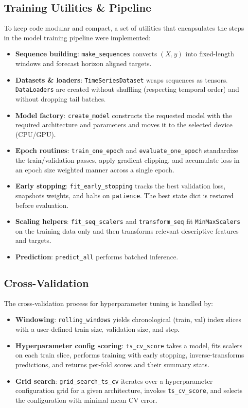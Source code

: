 \documentclass[conference]{IEEEtran}
\begin{document}
\subsection{\textbf{Training Utilities \& Pipeline}}
To keep code modular and compact, a set of utilities that encapsulates the steps in the model training pipeline were implemented:
\begin{itemize}
    \item \textbf{Sequence building}: \texttt{make\_sequences} converts $(X,y)$ into fixed-length windows and forecast horizon aligned targets.
    \item \textbf{Datasets \& loaders}: \texttt{TimeSeriesDataset} wraps sequences as tensors. \texttt{DataLoaders} are created without shuffling (respecting temporal order) and without dropping tail batches.
    \item \textbf{Model factory}: \texttt{create\_model} constructs the requested model with the required architecture and parameters and moves it to the selected device (CPU/GPU).
    \item \textbf{Epoch routines}: \texttt{train\_one\_epoch} and \texttt{evaluate\_one\_epoch} standardize the train/validation passes, apply gradient clipping, and accumulate loss in an epoch size weighted manner across a single epoch.
    \item \textbf{Early stopping}: \texttt{fit\_early\_stopping} tracks the best validation loss, snapshots weights, and halts on \texttt{patience}. The best state dict is restored before evaluation.
    \item \textbf{Scaling helpers}: \texttt{fit\_seq\_scalers} and \texttt{transform\_seq} fit \texttt{MinMaxScalers} on the training data only and then transforms relevant descriptive features and targets.
    \item \textbf{Prediction}: \texttt{predict\_all} performs batched inference.
\end{itemize}

\subsection{\textbf{Cross-Validation}}
The cross-validation process for hyperparameter tuning is handled by:
\begin{itemize}
    \item \textbf{Windowing}: \texttt{rolling\_windows} yields chronological (train, val) index slices with a user-defined train size, validation size, and step.
    \item \textbf{Hyperparameter config scoring}: \texttt{ts\_cv\_score} takes a model, fits scalers on each train slice, performs training with early stopping, inverse-transforms predictions, and returns per-fold scores and their summary stats.
    \item \textbf{Grid search}: \texttt{grid\_search\_ts\_cv} iterates over a hyperparameter configuration grid for a given architecture, invokes \texttt{ts\_cv\_score}, and selects the configuration with minimal mean CV error.
\end{itemize}
\end{document}
